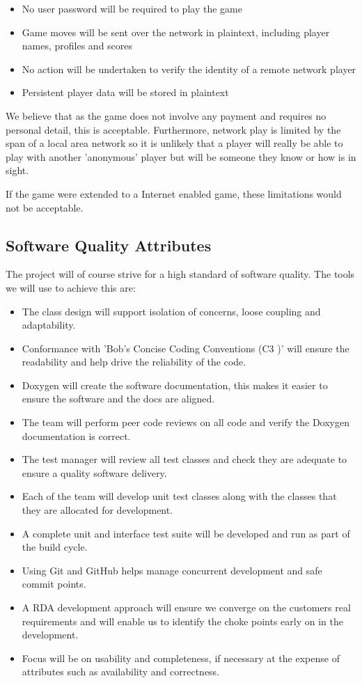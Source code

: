 \documentclass[a4paper,10pt]{article}
\begin{document}
\begin{itemize}
\item No user password will be required to play the game
\item Game moves will be sent over the network in plaintext, including player names, profiles and scores
\item No action will be undertaken to verify the identity of a remote network player
\item Persistent player data will be stored in plaintext
\end{itemize}

We believe that as the game does not involve any payment and requires no personal detail, this is acceptable. Furthermore, network play is limited by the span of a local area network so it is unlikely that a player will really be able to play with another 'anonymous' player but will be someone they know or how is in sight.

If the game were extended to a Internet enabled game, these limitations would not be acceptable. 

\subsection{Software Quality Attributes}

The project will of course strive for a high standard of software quality. The tools we will use to achieve this are:


\begin{itemize}
  \item The class design will support isolation of concerns, loose coupling and adaptability. 
  \item Conformance with    'Bob’s Concise Coding Conventions (C3 )' \cite{bobsccc} will ensure the readability and help drive the reliability of the code.
\item Doxygen will create the software documentation, this makes it easier to ensure the software and the docs are aligned.
\item The team will perform peer code reviews on all code and verify the Doxygen documentation is correct.
\item The test manager will review all test classes and check they are adequate to ensure a quality software delivery. 
  \item Each of the team will develop unit test classes along with the classes that they are allocated for development.
\item A complete unit and interface test suite will be developed and run as part of the build cycle. 
\item Using Git and GitHub helps  manage concurrent development and safe commit points. 
\item A RDA development approach will ensure we converge on the customers real requirements and will enable us to identify the choke points early on in the development. 
\item Focus will be on usability and completeness, if necessary at the expense of attributes such as availability and correctness. 
\end{itemize}
\end{document}

